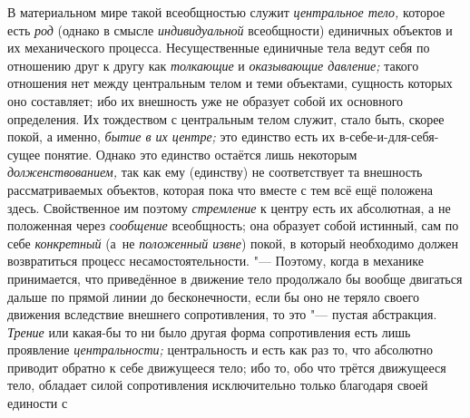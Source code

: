 В материальном мире такой всеобщностью служит
{\em центральное тело,}
которое есть {\em род}
(однако в смысле
{\em индивидуальной}
всеобщности) единичных объектов и их механического процесса.
Несущественные единичные тела ведут себя по отношению друг к другу как
{\em толкающие} и
{\em оказывающие давление;}
такого отношения нет между центральным телом и теми
объектами, сущность которых оно составляет; ибо их внешность уже не
образует собой их основного определения. Их тождеством с центральным телом
служит, стало быть, скорее покой, а именно,
{\em бытие в их центре;}
это единство есть их в-себе-и-для-себя-сущее понятие. Однако
это единство остаётся лишь некоторым
{\em долженствованием,}
так как ему (единству) не соответствует та внешность
рассматриваемых объектов, которая пока что вместе с тем всё ещё положена
здесь. Свойственное им поэтому
{\em стремление} к центру
есть их абсолютная, а не положенная через
{\em сообщение}
всеобщность; она образует собой истинный, сам по себе
{\em конкретный} (а~не
{\em положенный извне})
покой, в который необходимо должен возвратиться процесс
несамостоятельности. "--- Поэтому, когда в механике
принимается, что приведённое в движение тело продолжало бы вообще двигаться
дальше по прямой линии до бесконечности, если бы оно не теряло своего
движения вследствие внешнего сопротивления, то это "--- пустая
абстракция. {\em Трение}
или какая-бы то ни было другая форма
сопротивления есть лишь проявление
{\em центральности;}
центральность и есть как раз то, что абсолютно приводит
обратно к себе движущееся тело; ибо то, обо что трётся движущееся тело,
обладает силой сопротивления исключительно только благодаря своей единости
с
